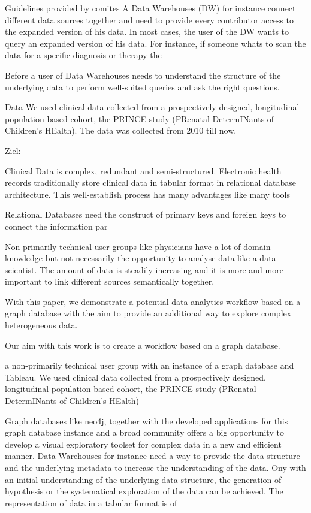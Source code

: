 Guidelines provided by comites 
A Data Warehouses (DW) for instance connect different data sources together and need to provide every contributor access to the expanded version of his data.  In most cases, the user of the DW wants to query an expanded version of his data. For instance, if someone whats to scan the data for a specific diagnosis or therapy the 

Before a user of Data Warehouses needs to understand the structure of the underlying data to perform well-suited queries and ask the right questions. 

Data
We used clinical data collected from a prospectively designed, longitudinal population-based cohort, the PRINCE study (PRenatal DetermINants of Children’s HEalth). The data was collected from 2010 till now.

Ziel: 

Clinical Data is complex, redundant and semi-structured.
Electronic health records traditionally store clinical data in tabular format in relational database architecture. 
This well-establish process has many advantages like many tools 

Relational Databases need the construct of primary keys and foreign keys to connect the information par

Non-primarily technical user groups like physicians have a lot of domain knowledge but not necessarily the opportunity to analyse data like a data scientist. 
The amount of data is steadily increasing and it is more and more important to link different sources semantically together. 



With this paper, we demonstrate a potential data analytics workflow based on a graph database with the aim to provide an additional way to explore complex heterogeneous data.

Our aim with this work is to create a workflow based on a graph database.

a non-primarily technical user group with an instance of a graph database and Tableau. We used clinical data collected from a prospectively designed, longitudinal population-based cohort, the PRINCE study (PRenatal DetermINants of Children’s HEalth)

Graph databases like neo4j, together with the developed applications for this graph database instance and a broad community offers a big opportunity to develop a visual exploratory toolset for complex data in a new and efficient manner. Data Warehouses for instance need a way to provide the data structure and the underlying metadata to increase the understanding of the data. Ony with an initial understanding of the underlying data structure, the generation of hypothesis or the systematical exploration of the data can be achieved. The representation of data in a tabular format is of 
 


